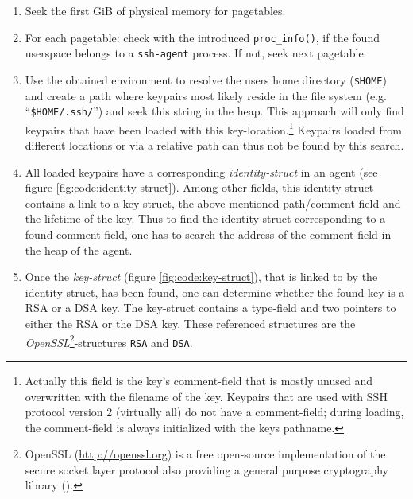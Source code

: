 \begin{enumerate}

	\item Seek the first GiB of physical memory for pagetables.

	\item For each pagetable: check with the introduced
		\texttt{proc\_info()}, if the found userspace belongs to a
		\texttt{ssh-agent} process. If not, seek next pagetable.

	\item Use the obtained environment to resolve the users home directory
		(\texttt{\$HOME}) and create a path where keypairs most likely
		reside in the file system (e.g.  ``\texttt{\$HOME/.ssh/}'') and
		seek this string in the heap.  This approach will only find
		keypairs that have been loaded with this
		key-location.\footnote{Actually this field is the key's
		comment-field that is mostly unused and overwritten with the
		filename of the key. Keypairs that are used with SSH protocol
		version 2 (virtually all) do not have a comment-field; during
		loading, the comment-field is always initialized with the keys
		pathname.} Keypairs loaded from different locations or via a
		relative path can thus not be found by this search.
	
	\item All loaded keypairs have a corresponding \emph{identity-struct} in
		an agent (see figure \ref{fig:code:identity-struct}). Among
		other fields, this identity-struct contains a link to a key
		struct, the above mentioned path/comment-field and the lifetime
		of the key. Thus to find the identity struct corresponding to a
		found comment-field, one has to search the address of the
		comment-field in the heap of the agent.
	
	\item Once the \emph{key-struct} (figure \ref{fig:code:key-struct}),
		that is linked to by the identity-struct, has been found, one
		can determine whether the found key is a RSA or a DSA key.  The
		key-struct contains a type-field and two pointers to either the
		RSA or the DSA key.  These referenced structures are the
		\emph{OpenSSL}\footnote{OpenSSL
		(\href{http://openssl.org}{http://openssl.org}) is a free
		open-source implementation of the secure socket layer protocol
		also providing a general purpose cryptography library
		().}-structures \texttt{RSA} and \texttt{DSA}.
	

\end{enumerate}
